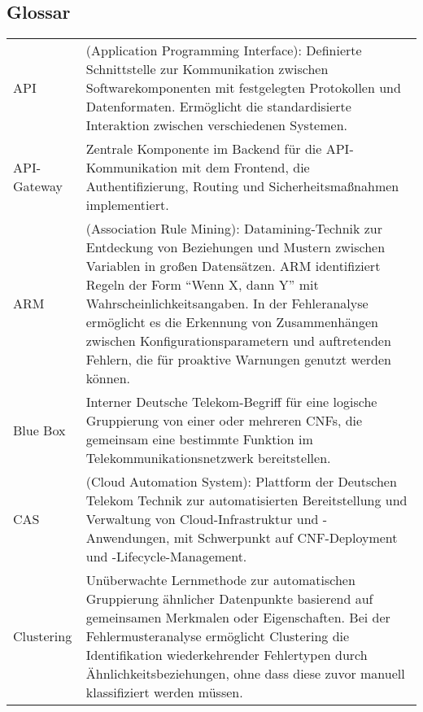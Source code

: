 \subsection*{Glossar}
\begingroup
\renewcommand{\arraystretch}{1.5}
\begin{tabularx}{\textwidth}{lX}

API & (Application Programming Interface): Definierte Schnittstelle zur Kommunikation zwischen Softwarekomponenten mit festgelegten Protokollen und Datenformaten. Ermöglicht die standardisierte Interaktion zwischen verschiedenen Systemen.\\

API-Gateway & Zentrale Komponente im Backend für die API-Kommunikation mit dem Frontend, die Authentifizierung, Routing und Sicherheitsmaßnahmen implementiert.\\

ARM & (Association Rule Mining): Datamining-Technik zur Entdeckung von Beziehungen und Mustern zwischen Variablen in großen Datensätzen. ARM identifiziert Regeln der Form \textquotedblleft Wenn X, dann Y\textquotedblright{} mit Wahrscheinlichkeitsangaben. In der Fehleranalyse ermöglicht es die Erkennung von Zusammenhängen zwischen Konfigurationsparametern und auftretenden Fehlern, die für proaktive Warnungen genutzt werden können.\\

Blue Box & Interner Deutsche Telekom-Begriff für eine logische Gruppierung von einer oder mehreren CNFs, die gemeinsam eine bestimmte Funktion im Telekommunikationsnetzwerk bereitstellen.\\

CAS & (Cloud Automation System): Plattform der Deutschen Telekom Technik zur automatisierten Bereitstellung und Verwaltung von Cloud-Infrastruktur und -Anwendungen, mit Schwerpunkt auf CNF-Deployment und -Lifecycle-Management.\\

Clustering & Unüberwachte Lernmethode zur automatischen Gruppierung ähnlicher Datenpunkte basierend auf gemeinsamen Merkmalen oder Eigenschaften. Bei der Fehlermusteranalyse ermöglicht Clustering die Identifikation wiederkehrender Fehlertypen durch Ähnlichkeitsbeziehungen, ohne dass diese zuvor manuell klassifiziert werden müssen.\\


\end{tabularx}
